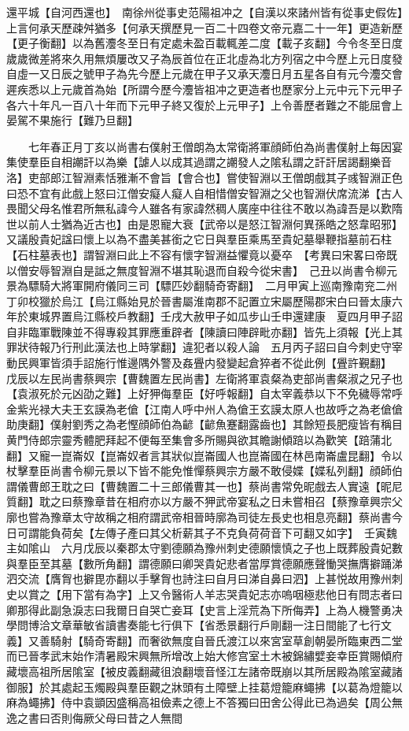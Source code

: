 還平城【自河西還也】　南徐州從事史范陽祖冲之【自漢以來諸州皆有從事史假佐】上言何承天歷疎舛猶多【何承天撰歷見一百二十四卷文帝元嘉二十一年】更造新歷【更子衡翻】以為舊灋冬至日有定處未盈百載輒差二度【載子亥翻】今令冬至日度歲歲微差將來久用無煩屢改又子為辰首位在正北虛為北方列宿之中今歷上元日度發自虛一又日辰之號甲子為先今歷上元歲在甲子又承天灋日月五星各自有元今灋交會遲疾悉以上元歲首為始【所謂今歷今灋皆祖冲之更造者也歷家分上元中元下元甲子各六十年凡一百八十年而下元甲子終又復於上元甲子】上令善歷者難之不能屈會上晏駕不果施行【難乃旦翻】

　　七年春正月丁亥以尚書右僕射王僧朗為太常衛將軍顔師伯為尚書僕射上每因宴集使羣臣自相謿訐以為樂【謔人以成其過謂之謿發人之隂私謂之訐訐居謁翻樂音洛】吏部郎江智淵素恬雅漸不會旨【會合也】嘗使智淵以王僧朗戲其子彧智淵正色曰恐不宜有此戲上怒曰江僧安癡人癡人自相惜僧安智淵之父也智淵伏席流涕【古人畏聞父母名惟君所無私諱今人雖各有家諱然稠人廣座中往往不敢以為諱吾是以歎隋世以前人士猶為近古也】由是恩寵大衰【武帝以是怒江智淵何異孫皓之怒韋昭邪】又議殷貴妃諡曰懷上以為不盡美甚銜之它日與羣臣乘馬至貴妃墓舉鞭指墓前石柱【石柱墓表也】謂智淵曰此上不容有懷字智淵益懼竟以憂卒　【考異曰宋畧曰帝既以僧安辱智淵自是詆之無度智淵不堪其恥退而自殺今從宋書】　己丑以尚書令柳元景為驃騎大將軍開府儀同三司【驃匹妙翻騎奇寄翻】　二月甲寅上巡南豫南兖二州丁卯校獵於烏江【烏江縣始見於晉書屬淮南郡不記置立宋屬歷陽郡宋白曰晉太康六年於東城界置烏江縣校戶教翻】壬戌大赦甲子如瓜步山壬申還建康　夏四月甲子詔自非臨軍戰陳並不得專殺其罪應重辟者【陳讀曰陣辟毗亦翻】皆先上須報【光上其罪狀待報乃行刑此漢法也上時掌翻】違犯者以殺人論　五月丙子詔曰自今刺史守宰動民興軍皆須手詔施行惟邊隅外警及姦舋内發變起倉猝者不從此例【舋許覲翻】　戊辰以左民尚書蔡興宗【曹魏置左民尚書】左衛將軍袁粲為吏部尚書粲淑之兄子也【袁淑死於元凶劭之難】上好狎侮羣臣【好呼報翻】自太宰義恭以下不免穢辱常呼金紫光禄大夫王玄謨為老傖【江南人呼中州人為傖王玄謨太原人也故呼之為老傖傖助庚翻】僕射劉秀之為老慳顔師伯為齴【齴魚蹇翻露齒也】其餘短長肥瘦皆有稱目黄門侍郎宗靈秀體肥拜起不便每至集會多所賜與欲其瞻謝傾踣以為歡笑【踣蒲北翻】又寵一崑崙奴【崑崙奴者言其狀似崑崙國人也崑崙國在林邑南崙盧昆翻】令以杖擊羣臣尚書令柳元景以下皆不能免惟憚蔡興宗方嚴不敢侵媟【媟私列翻】顔師伯謂儀曹郎王耽之曰【曹魏置二十三郎儀曹其一也】蔡尚書常免昵戲去人實遠【昵尼質翻】耽之曰蔡豫章昔在相府亦以方嚴不狎武帝宴私之日未嘗相召【蔡豫章興宗父廓也嘗為豫章太守故稱之相府謂武帝相晉時廓為司徒左長史也相息亮翻】蔡尚書今日可謂能負荷矣【左傳子產曰其父析薪其子不克負荷荷音下可翻又如字】　壬寅魏主如隂山　六月戊辰以秦郡太守劉德願為豫州刺史德願懷慎之子也上既葬殷貴妃數與羣臣至其墓【數所角翻】謂德願曰卿哭貴妃悲者當厚賞德願應聲慟哭撫膺擗踊涕泗交流【膺胷也擗毘亦翻以手擊胷也詩注曰自月曰涕自鼻曰泗】上甚悦故用豫州刺史以賞之【用下當有為字】上又令醫術人羊志哭貴妃志亦嗚咽極悲他日有問志者曰卿那得此副急淚志曰我爾日自哭亡妾耳【史言上淫荒為下所侮弄】上為人機警勇决學問博洽文章華敏省讀書奏能七行俱下【省悉景翻行戶剛翻一注日間能了七行文義】又善騎射【騎奇寄翻】而奢欲無度自晉氏渡江以來宮室草創朝晏所臨東西二堂而已晉孝武末始作清暑殿宋興無所增改上始大修宫室土木被錦繡嬖妾幸臣賞賜傾府藏壞高祖所居隂室【被皮義翻藏徂浪翻壞音怪江左諸帝既崩以其所居殿為隂室藏諸御服】於其處起玉燭殿與羣臣觀之牀頭有土障壁上挂葛燈籠麻蠅拂【以葛為燈籠以麻為蠅拂】侍中袁顗因盛稱高祖儉素之德上不答獨曰田舍公得此已為過矣【周公無逸之書曰否則侮厥父母曰昔之人無間